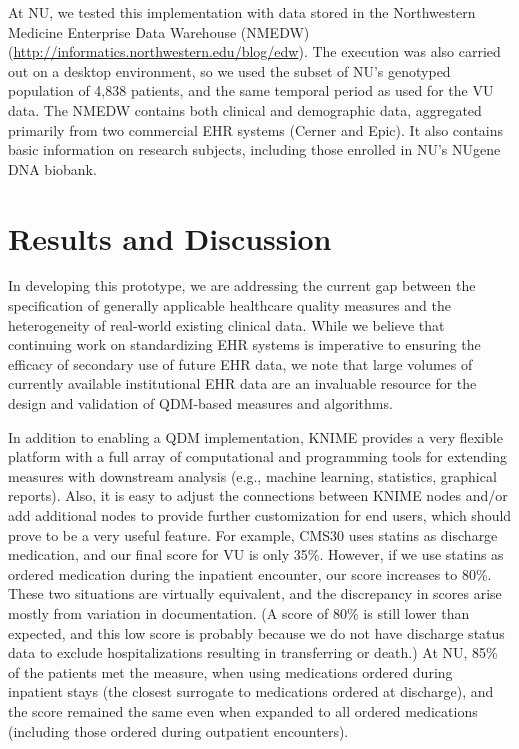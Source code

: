\documentclass{article}
\begin{document}
At NU, we tested this implementation with data stored in the Northwestern Medicine Enterprise Data Warehouse (NMEDW) (\url{http://informatics.northwestern.edu/blog/edw}). The execution was also carried out on a desktop environment, so we used the subset of NU's genotyped population of 4,838 patients, and the same temporal period as used for the VU data.  The NMEDW contains both clinical and demographic data, aggregated primarily from two commercial EHR systems (Cerner and Epic). It also contains basic information on research subjects, including those enrolled in NU's NUgene DNA biobank.


\section{Results and Discussion}

In developing this prototype, we are addressing the current gap between the specification of generally applicable healthcare quality measures and the heterogeneity of real-world existing clinical data. While we believe that continuing work on standardizing EHR systems is imperative to ensuring the efficacy of secondary use of future EHR data, we note that large volumes of currently available institutional EHR data are an invaluable resource for the design and validation of QDM-based measures and algorithms.

In addition to enabling a QDM implementation, KNIME provides a very flexible platform with a full array of computational and programming tools for extending measures with downstream analysis (e.g., machine learning, statistics, graphical reports). Also, it is easy to adjust the connections between KNIME nodes and/or add additional nodes to provide further customization for end users, which should prove to be a very useful feature. For example, CMS30 uses statins as discharge medication, and our final score for VU is only 35\%. However, if we use statins as ordered medication during the inpatient encounter, our score increases to 80\%. These two situations are virtually equivalent, and the discrepancy in scores arise mostly from variation in documentation. (A score of 80\% is still lower than expected, and this low score is probably because we do not have discharge status data to exclude hospitalizations resulting in transferring or death.) At NU, 85\% of the patients met the measure, when using medications ordered during inpatient stays (the closest surrogate to medications ordered at discharge), and the score remained the same even when expanded to all ordered medications (including those ordered during outpatient encounters).
\end{document}

